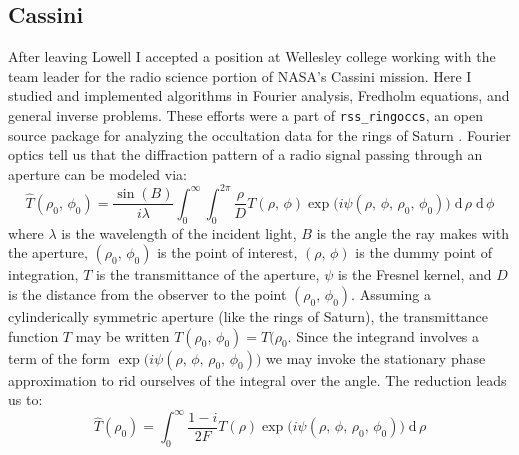 \documentclass{article}
\theoremstyle{plain}
\begin{document}
        \subsection{Cassini}
            After leaving Lowell I accepted a position at Wellesley college
            working with the team leader for the radio science portion of NASA's
            Cassini mission. Here I studied and implemented algorithms in
            Fourier analysis, Fredholm equations, and general inverse problems.
            These efforts were a part of \texttt{rss\_ringoccs}, an open source
            package for analyzing the occultation data for the rings of Saturn
            \cite{rssringoccs}. Fourier optics tell us that the diffraction
            pattern of a radio signal passing through an aperture can be
            modeled via:
            \begin{equation}
                \hat{T}(\rho_{0},\,\phi_{0})=
                    \frac{\sin(B)}{i\lambda}
                    \int_{0}^{\infty}
                    \int_{0}^{2\pi}
                        \frac{\rho}{D}
                        T(\rho,\,\phi)
                        \exp\big(i\psi(\rho,\,\phi,\,\rho_{0},\,\phi_{0})\big)\;
                    \textrm{d}\,\rho\;
                    \textrm{d}\,\phi
            \end{equation}
            where $\lambda$ is the wavelength of the incident light, $B$ is
            the angle the ray makes with the aperture, $(\rho_{0},\,\phi_{0})$
            is the point of interest, $(\rho,\,\phi)$ is the dummy point of
            integration, $T$ is the transmittance of the aperture, $\psi$ is
            the Fresnel kernel, and $D$ is the distance from the observer to
            the point $(\rho_{0},\,\phi_{0})$. Assuming a cylinderically
            symmetric aperture (like the rings of Saturn),
            the transmittance function $T$ may be written
            $T(\rho_{0},\,\phi_{0})=T(\rho_{0}$. Since the integrand involves a
            term of the form
            $\exp\big(i\psi(\rho,\,\phi,\,\rho_{0},\,\phi_{0})\big)$ we may
            invoke the stationary phase approximation to rid ourselves of the
            integral over the angle. The reduction leads us to:
            \begin{equation}
                \hat{T}(\rho_{0})=
                    \int_{0}^{\infty}
                        \frac{1-i}{2F}
                        T(\rho)
                        \exp\big(i\psi(\rho,\,\phi,\,\rho_{0},\,\phi_{0})\big)\;
                    \textrm{d}\,\rho
            \end{equation}
\end{document}
